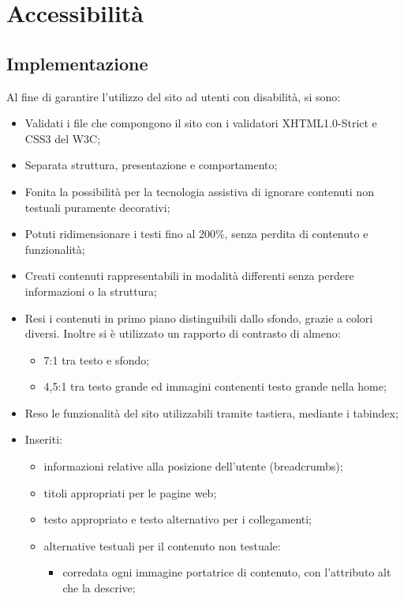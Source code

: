 \section{Accessibilità}{
	\subsection{Implementazione}{
	Al fine di garantire l'utilizzo del sito ad utenti con disabilità, si sono:
	\begin{itemize}\itemsep0.5pt
		\item Validati i file che compongono il sito con i validatori XHTML1.0-Strict e CSS3 del W3C;
		\item Separata struttura, presentazione e comportamento;
		\item Fonita la possibilità per la tecnologia assistiva di ignorare contenuti non testuali puramente decorativi;
		\item Potuti ridimensionare i testi fino al 200\%, senza perdita di contenuto e funzionalità;
		\item Creati contenuti rappresentabili in modalità differenti senza perdere informazioni o la struttura;  
		\item Resi i contenuti in primo piano distinguibili dallo sfondo, grazie a colori diversi. Inoltre si è utilizzato un rapporto di contrasto di almeno: 
		\begin{itemize}\itemsep1pt
			\item 7:1 tra testo e sfondo;
			\item 4,5:1 tra testo grande ed immagini contenenti testo grande nella home;
		\end{itemize}
		\item Reso le funzionalità del sito utilizzabili tramite tastiera, mediante i tabindex;
		\item Inseriti:
		\begin{itemize}\itemsep0.5pt
			\item informazioni relative alla posizione dell'utente (breadcrumbs); 
			\item titoli appropriati  per le pagine web; 
			\item testo appropriato e testo alternativo per i collegamenti; 
			\item alternative testuali per il contenuto non testuale:
				\begin{itemize} \itemsep0.5pt
					\item corredata ogni immagine portatrice di contenuto, con l'attributo alt che la descrive;

\end{itemize}
\end{itemize}
\end{itemize}}}

